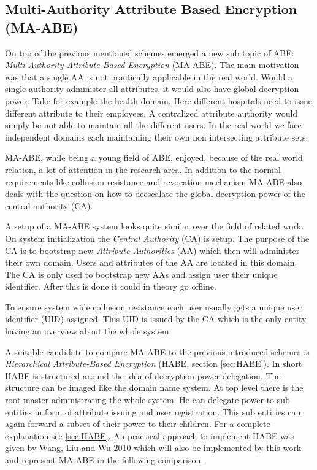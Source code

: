 \subsection{Multi-Authority Attribute Based Encryption (MA-ABE)}
On top of the previous mentioned schemes emerged a new sub topic of \ac{ABE}: \textit{Multi-Authority Attribute Based Encryption} (\ac{MA-ABE}). The main motivation was that a single \ac{AA} is not practically applicable in the real world. Would a single authority administer all attributes, it would also have global decryption power. Take for example the health domain. Here different hospitals need to issue different attribute to their employees. A centralized attribute authority would simply be not able to maintain all the different users. In the real world we face independent domains each maintaining their own non intersecting attribute sets. 

\ac{MA-ABE}, while being a young field of \ac{ABE}, enjoyed, because of the real world relation, a lot of attention in the research area. In addition to the normal requirements like collusion resistance and revocation mechanism \ac{MA-ABE} also deals with the question on how to deescalate the global decryption power of the central authority (\ac{CA}). 

A setup of a \ac{MA-ABE} system looks quite similar over the field of related work. On system initialization the \textit{Central Authority} (\ac{CA}) is setup. The purpose of the \ac{CA} is to bootstrap new \textit{Attribute Authorities} (\ac{AA}) which then will administer their own domain. Users and attributes of the \ac{AA} are located in this domain. The CA is only used to bootstrap new AAs and assign user their unique identifier. After this is done it could in theory go offline. 

To ensure system wide collusion resistance each user usually gets a unique user identifier (\ac{UID}) assigned. This \ac{UID} is issued by the \ac{CA} which is the only entity having an overview about the whole system. 

A suitable candidate to compare \ac{MA-ABE} to the previous introduced schemes is \textit{Hierarchical Attribute-Based Encryption} (\ac{HABE}, section \ref{sec:HABE}). In short \ac{HABE} is structured around the idea of decryption power delegation. The structure can be imaged like the domain name system. At top level there is the root master administrating the whole system. He can delegate power to sub entities in form of attribute issuing and user registration. This sub entities can again forward a subset of their power to their children. For a complete explanation see \ref{sec:HABE}. An practical approach to implement HABE was given by Wang, Liu and Wu 2010 \cite{Wang:2010:HAE:1866307.1866414} which will also be implemented by this work and represent \ac{MA-ABE} in the following comparison. 

